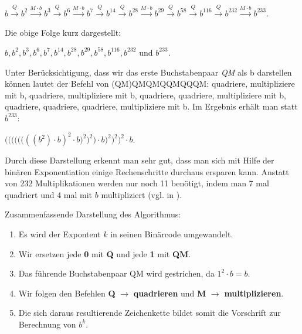 \documentclass[12pt,a4paper]{article}
\theoremstyle{definition}
\begin{document}
$b\stackrel{Q}{\longrightarrow}b^2\stackrel{M \cdot b}{\longrightarrow}b^3\stackrel{Q}{\longrightarrow}b^6\stackrel{M \cdot b}{\longrightarrow}b^7\stackrel{Q}{\longrightarrow}b^{14}\stackrel{Q}{\longrightarrow}b^{28}\stackrel{M \cdot b}{\longrightarrow}b^{29}\stackrel{Q}{\longrightarrow}b^{58}\stackrel{Q}{\longrightarrow}b^{116}\stackrel{Q}{\longrightarrow}b^{232}\stackrel{M \cdot b}{\longrightarrow}b^{233}$.

Die obige Folge kurz dargestellt:
\begin{center}
$b, b^2, b^3, b^6, b^7, b^{14}, b^{28}, b^{29}, b^{58}, b^{116}, b^{232}$ und $b^{233}$.
\end{center}

Unter Berücksichtigung, dass wir das erste Buchstabenpaar \textit{QM} als b darstellen können lautet der Befehl von (QM)QMQMQQMQQQM: quadriere, multipliziere mit b, quadriere, multipliziere mit b, quadriere, quadriere, multipliziere mit b, quadriere, quadriere, quadriere, multipliziere mit b.\newline
Im Ergebnis erhält man statt $b^{233}$:
\begin{center}
$\Biggl(\Biggl(\biggl(\biggl(\bigl(\bigl(((b^2)\cdot b)^2 \cdot b\bigr)^2\bigr)^2\biggr) \cdot b\biggr)^2\Biggr)^2\Biggr)^2 \cdot b$.
\end{center}

Durch diese Darstellung erkennt man sehr gut, dass man sich mit Hilfe der binären Exponentiation einige Rechenschritte durchaus ersparen kann.
Anstatt von 232 Multiplikationen werden nur noch 11 benötigt, indem man 7 mal quadriert und 4 mal mit $b$ multipliziert (vgl. \cite{Knuth1971} in \cite[117--121]{Arndt2000}).

Zusammenfassende Darstellung des Algorithmus:
\begin{enumerate}
    \item Es wird der Expontent $k$ in seinen Binärcode umgewandelt.
    \item Wir ersetzen jede \textbf{0} mit \textbf{Q} und jede \textbf{1} mit \textbf{QM}.
    \item Das führende Buchstabenpaar QM wird gestrichen, da ${1^2 \cdot b = b}$.
    \item Wir folgen den Befehlen \textbf{Q} $\rightarrow$ \textbf{quadrieren} und \textbf{M} $\rightarrow$ \textbf{multiplizieren}.
    \item Die sich daraus resultierende Zeichenkette bildet somit die Vorschrift zur Berechnung von $b^k$.
\end{enumerate}
\end{document}
